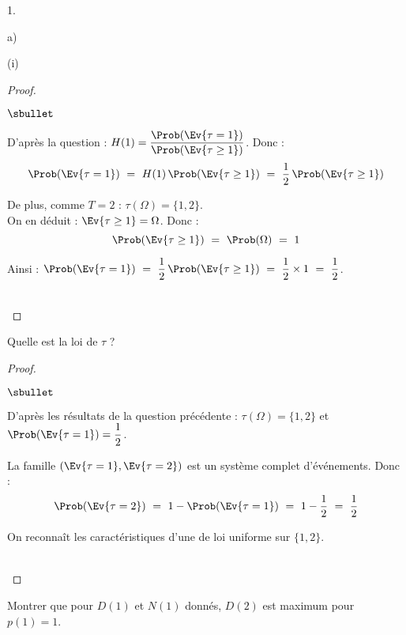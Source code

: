 \begin{noliste}{1.}
\begin{noliste}{a)}
\begin{nonoliste}{(i)}
      \begin{proof}~
        \begin{noliste}{$\sbullet$}
	  \item D'après la question  : $H(1) = 
	  \dfrac{\Prob(\Ev{\tau =1})}{\Prob(\Ev{\tau \geq 1})}$. Donc :
	  \[
	    \Prob(\Ev{\tau =1}) \ = \ H(1) \, \Prob(\Ev{\tau \geq 1})
	    \ = \ \dfrac{1}{2} \, \Prob(\Ev{\tau \geq 1})
	  \]
	  
	  \item De plus, comme $T=2$ : $\tau (\Omega) = \{1,2\}$.\\
	  On en déduit : $\Ev{\tau \geq 1} = \Omega$. Donc :
	  \[
	    \Prob(\Ev{\tau \geq 1}) \ = \ \Prob(\Omega) \ = \ 1
	  \]
	  
	  \item Ainsi : $\Prob(\Ev{\tau =1}) \ = \ \dfrac{1}{2} \,
	  \Prob(\Ev{\tau \geq 1}) \ = \  \dfrac{1}{2} \times 1 \ = \
	  \dfrac{1}{2}$.
        \end{noliste}
        ~\\[-1cm]
      \end{proof}
      
      
      \newpage

      
      \item Quelle est la loi de $\tau$ ?
      
      \begin{proof}~
        \begin{noliste}{$\sbullet$}
	  \item D'après les résultats de la question précédente : 
	  $\tau(\Omega) = \{1,2\}$ et $\Prob(\Ev{\tau=1}) = 
	  \dfrac{1}{2}$.
	  
	  \item La famille $(\Ev{\tau=1}, \Ev{\tau=2})$ est un 
	  système complet d'événements. Donc :
	  \[
	    \Prob(\Ev{\tau=2}) \ = \ 1-\Prob(\Ev{\tau =1}) \ = \ 1-
	    \dfrac{1}{2} \ = \ \dfrac{1}{2}
	  \]
	  
	  \item On reconnaît les caractéristiques d'une \var de loi 
	  uniforme sur $\{1,2\}$.
        \end{noliste}
        ~\\[-1.2cm]
      \end{proof}
    \end{nonoliste}
    
    \item Montrer que pour $D(1)$ et $N(1)$ donnés, $D(2)$ est maximum
    pour $p(1)=1$.
    

\end{noliste}
\end{noliste}
